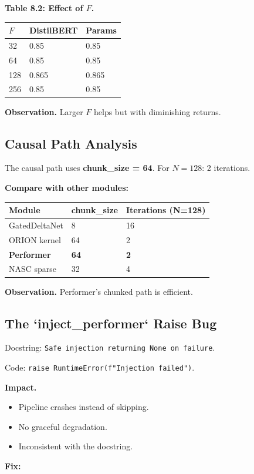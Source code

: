 \textbf{Table 8.2: Effect of $F$.}

\begin{table}[H]
\centering
\small
\begin{tabular}{lll}
\toprule
\textbf{$F$} & \textbf{DistilBERT} & \textbf{Params} \\
\midrule
32 & 0.85 & 0.85 \\
64 & 0.85 & 0.85 \\
128 & 0.865 & 0.865 \\
256 & 0.85 & 0.85 \\
\bottomrule
\end{tabular}
\end{table}

\textbf{Observation.} Larger $F$ helps but with diminishing returns.

\subsection{Causal Path Analysis}

The causal path uses \textbf{chunk\_size = 64}. For $N = 128$: 2 iterations.

\textbf{Compare with other modules:}

\begin{table}[H]
\centering
\small
\begin{tabular}{lll}
\toprule
\textbf{Module} & \textbf{chunk\_size} & \textbf{Iterations (N=128)} \\
\midrule
GatedDeltaNet & 8 & 16 \\
ORION kernel & 64 & 2 \\
\textbf{Performer} & \textbf{64} & \textbf{2} \\
NASC sparse & 32 & 4 \\
\bottomrule
\end{tabular}
\end{table}

\textbf{Observation.} Performer's chunked path is efficient.

\subsection{The `inject\_performer` Raise Bug}

Docstring: \texttt{Safe injection returning None on failure}.

Code: \texttt{raise RuntimeError(f"Injection failed")}.

\textbf{Impact.}

\begin{itemize}
\item Pipeline crashes instead of skipping.
\item No graceful degradation.
\item Inconsistent with the docstring.

\end{itemize}
\textbf{Fix:}

